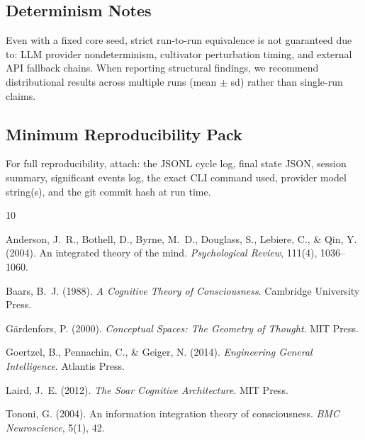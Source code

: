 \documentclass[11pt,a4paper]{article}
\begin{document}
\subsection{Determinism Notes}

Even with a fixed core seed, strict run-to-run equivalence is not guaranteed 
due to: LLM provider nondeterminism, cultivator perturbation timing, and 
external API fallback chains. When reporting structural findings, we recommend 
distributional results across multiple runs (mean $\pm$ sd) rather than 
single-run claims.

\subsection{Minimum Reproducibility Pack}

For full reproducibility, attach: the JSONL cycle log, final state JSON, 
session summary, significant events log, the exact CLI command used, provider 
model string(s), and the git commit hash at run time.

\begin{thebibliography}{10}

Anderson, J.~R., Bothell, D., Byrne, M.~D., Douglass, S., Lebiere, C., 
\& Qin, Y. (2004).
\newblock An integrated theory of the mind.
\newblock \textit{Psychological Review}, 111(4), 1036--1060.

Baars, B.~J. (1988).
\newblock \textit{A Cognitive Theory of Consciousness}.
\newblock Cambridge University Press.

G{\"a}rdenfors, P. (2000).
\newblock \textit{Conceptual Spaces: The Geometry of Thought}.
\newblock MIT Press.

Goertzel, B., Pennachin, C., \& Geiger, N. (2014).
\newblock \textit{Engineering General Intelligence}.
\newblock Atlantis Press.

Laird, J.~E. (2012).
\newblock \textit{The Soar Cognitive Architecture}.
\newblock MIT Press.

Tononi, G. (2004).
\newblock An information integration theory of consciousness.
\newblock \textit{BMC Neuroscience}, 5(1), 42.

\end{thebibliography}
\end{document}
